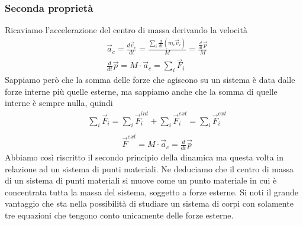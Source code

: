 \documentclass[10pt,a4paper]{article}
\begin{document}
\subsubsection{Seconda proprietà}
Ricaviamo l'accelerazione del centro di massa derivando la velocità
\begin{align*}
&\vec{a}_c = \frac{d\vec{v}_c}{dt}=\frac{\sum_{i}\frac{d}{dt}(m_i \vec{v}_i)}{M}=\frac{\frac{d}{dt}\vec{p}}{M}\\
&\frac{d}{dt}\vec{p} = M \cdot \vec{a}_c = \sum_{i}\vec{F}_i
\end{align*}
Sappiamo però che la somma delle forze che agiscono su un sistema è data dalle forze interne più quelle esterne, ma sappiamo anche che la somma di quelle interne è sempre nulla, quindi
\begin{align*}
&\sum_{i}\vec{F}_i=\sum_{i}\vec{F}^{int}_i+\sum_{i}\vec{F}^{ext}_i=\sum_{i}\vec{F}^{ext}_i\\
\end{align*}
\begin{align}\label{eq:cardinale1}
&\vec{F}^{ext} = M \cdot \vec{a}_c = {\frac{d}{dt}\vec{p}}
\end{align}
Abbiamo così riscritto il secondo principio della dinamica ma questa volta in relazione ad un sistema di punti materiali. Ne deduciamo che il centro di massa di un sistema di punti materiali si muove come un punto materiale in cui è concentrata tutta la massa del sistema, soggetto a forze esterne. Si noti il grande vantaggio che sta nella possibilità di studiare un sistema di corpi con solamente tre equazioni che tengono conto unicamente delle forze esterne. 
\end{document}
